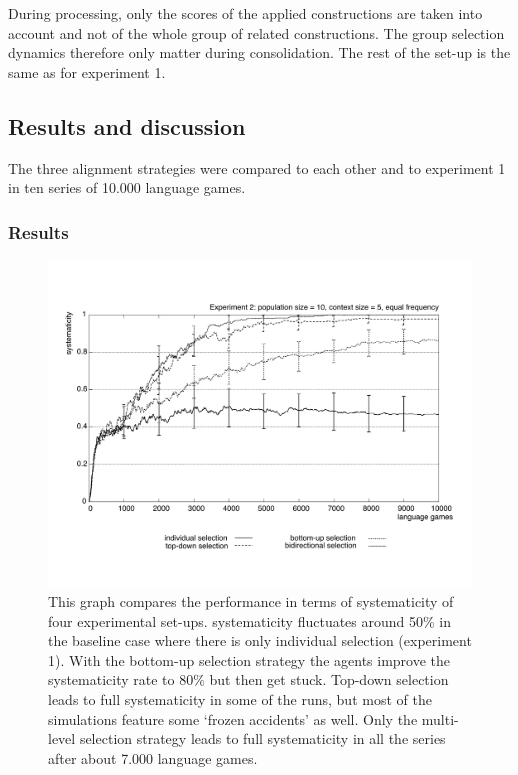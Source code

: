 During processing, only the scores of the applied constructions are taken into account and not of the whole group of related constructions. The group selection dynamics therefore only matter during consolidation. The rest of the set-up is the same as for experiment 1.

\subsection{Results and discussion}



The three alignment strategies were compared to each other and to experiment 1 in ten series of 10.000 language games.


\subsubsection{Results}
\begin{figure}[t]
\centerline{\includegraphics[width=\textwidth]{Chapter4/figs/systematicity-vs-2}}
  \caption[Experiment 2: systematicity]{This graph compares the performance in terms of systematicity of four experimental set-ups. systematicity fluctuates around 50\% in the baseline case where there is only individual selection (experiment 1). With the bottom-up selection strategy the agents improve the systematicity rate to 80\% but then get stuck. Top-down selection leads to full systematicity in some of the runs, but most of the simulations feature some `frozen accidents' as well. Only the multi-level selection strategy leads to full systematicity in all the series after about 7.000 language games.}
   \label{f:systematicity2}
\end{figure}

